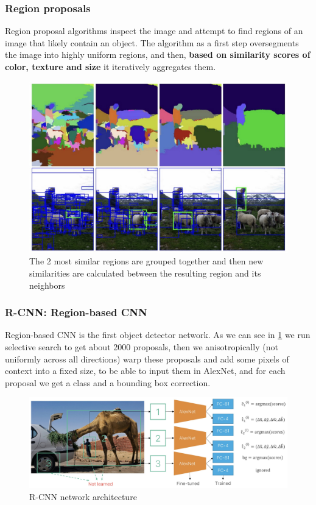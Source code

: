 \subsubsection{Region proposals}
Region proposal algorithms inspect the image and attempt to find regions of an image that likely contain an object.
The algorithm as a first step oversegments the image into highly uniform regions, and then, \textbf{based on similarity scores of color, texture and size} it iteratively aggregates them.

\begin{figure}[htbp]
  \centering
  \includegraphics[width=0.6\linewidth]{./img/region_proposal.jpg}
  \caption{The 2 most similar regions are grouped together and then new similarities are calculated between the resulting region and its neighbors}
\end{figure}

\subsubsection{R-CNN: Region-based CNN}

Region-based CNN is the first object detector network.
As we can see in \ref{fig:rcnn} we run selective search to get about 2000 proposals, then we anisotropically (not uniformly across all directions) warp these proposals and add some pixels of context into a fixed size, to be able to input them in AlexNet, and for each proposal we get a class and a bounding box correction.

\begin{figure}[htbp]
  \centering
  \includegraphics[width=0.8\linewidth]{./img/rcnn.jpg}
  \caption{R-CNN network architecture}
  \label{fig:rcnn}
\end{figure}

